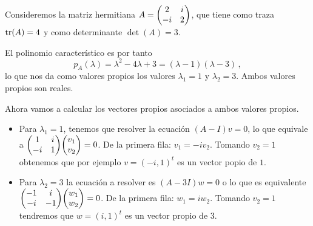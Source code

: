 \begin{eje}
  Consideremos la matriz hermitiana $A=\mqty(2 & i \\ -i & 2)$, que tiene como traza $\tr(A) = 4$ y como determinante $\det(A) = 3$.

  El polinomio característico es por tanto
  \[
    p_A(\lambda) = \lambda^2 - 4\lambda + 3 = (\lambda-1)(\lambda-3)\,,
  \]
  lo que nos da como valores propios los valores $\lambda_1=1$ y $\lambda_2=3$.
  Ambos valores propios son reales.

  Ahora vamos a calcular los vectores propios asociados a ambos valores propios.
  \begin{itemize}
    \item
          Para $\lambda_1=1$, tenemos que resolver la ecuación $(A-I)v=0$, lo que equivale a $\mqty(1&i\\-i&1)\mqty(v_1\\v_2)=0$. De la primera fila: $v_1=-iv_2$. Tomando $v_2=1$ obtenemos que por ejemplo $v=(-i,1)^t$ es un vector popio de $1$.

    \item
          Para $\lambda_2=3$ la ecuación a resolver es $(A-3I)w=0$ o lo que es equivalente $\mqty(-1&i\\-i&-1)\mqty(w_1\\w_2)=0$. De la primera fila: $w_1=iw_2$. Tomando $v_2=1$ tendremos que $w=(i,1)^t$ es un vector propio de $3$.
  \end{itemize}

\end{eje}

